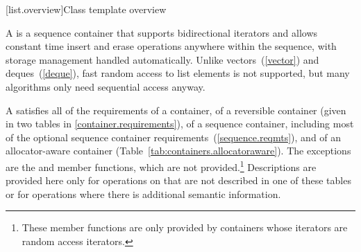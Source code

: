[list.overview]{Class template  overview}

\pnum
{}%
A
is a sequence container that supports
bidirectional iterators and allows constant time insert and erase
operations anywhere within the sequence, with storage management handled
automatically. Unlike vectors~(\ref{vector}) and deques~(\ref{deque}),
fast random access to list elements is not supported, but many
algorithms only need sequential access anyway.

\pnum
A  satisfies all of the requirements of a container, of
a reversible container (given in two tables in
\ref{container.requirements}), of a sequence container,
including most of the optional sequence container
requirements~(\ref{sequence.reqmts}), and of an allocator-aware container
(Table~\ref{tab:containers.allocatoraware}).
The exceptions are the
and
member functions, which are not provided.\footnote{These member functions
are only provided by containers whose iterators
are random access iterators.
}
Descriptions are provided here only for operations on
that are not described in one of these tables
or for operations where there is additional semantic information.

